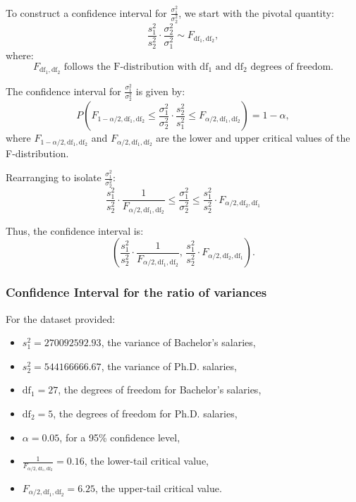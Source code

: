 \documentclass[12pt,a4paper]{article}
\begin{document}
To construct a confidence interval for \( \frac{\sigma_1^2}{\sigma_2^2} \), we start with the pivotal quantity:
\[
\frac{s_1^2}{s_2^2} \cdot \frac{\sigma_2^2}{\sigma_1^2} \sim F_{\text{df}_1, \text{df}_2},
\]
where:
\[
F_{\text{df}_1, \text{df}_2} \text{ follows the F-distribution with } \text{df}_1 \text{ and } \text{df}_2 \text{ degrees of freedom.}
\]

The confidence interval for \( \frac{\sigma_1^2}{\sigma_2^2} \) is given by:
\[
P \left( F_{1-\alpha/2, \text{df}_1, \text{df}_2} \leq \frac{\sigma_1^2}{\sigma_2^2} \cdot \frac{s_2^2}{s_1^2} \leq F_{\alpha/2, \text{df}_1, \text{df}_2} \right) = 1 - \alpha,
\]
where \( F_{1-\alpha/2, \text{df}_1, \text{df}_2} \) and \( F_{\alpha/2, \text{df}_1, \text{df}_2} \) are the lower and upper critical values of the F-distribution.

Rearranging to isolate \( \frac{\sigma_1^2}{\sigma_2^2} \):
\[
\frac{s_1^2}{s_2^2} \cdot \frac{1}{F_{\alpha/2, \text{df}_1, \text{df}_2}} \leq \frac{\sigma_1^2}{\sigma_2^2} \leq \frac{s_1^2}{s_2^2} \cdot F_{\alpha/2, \text{df}_2 , \text{df}_1}
\]

Thus, the confidence interval is:
\[
\left( {\frac{s_1^2}{s_2^2}} \cdot \frac{1}{F_{\alpha/2, \text{df}_1, \text{df}_2}} , \, {\frac{s_1^2}{s_2^2}} \cdot {F_{\alpha/2, \text{df}_2, \text{df}_1}} \right).
\]

\subsubsection*{Confidence Interval for the ratio of variances}

For the dataset provided:
\begin{itemize}
    \item \( s_1^2 = 270092592.93 \), the variance of Bachelor's salaries,
    \item \( s_2^2 = 544166666.67 \), the variance of Ph.D. salaries,
    \item \( \text{df}_1 = 27 \), the degrees of freedom for Bachelor's salaries,
    \item \( \text{df}_2 = 5 \), the degrees of freedom for Ph.D. salaries,
    \item \( \alpha = 0.05 \), for a 95\% confidence level,
    \item \( \frac{1}{F_{\alpha/2, \text{df}_1, \text{df}_2}} = 0.16 \), the lower-tail critical value,
    \item \( F_{\alpha/2, \text{df}_1, \text{df}_2} = 6.25 \), the upper-tail critical value.
\end{itemize}
\end{document}
